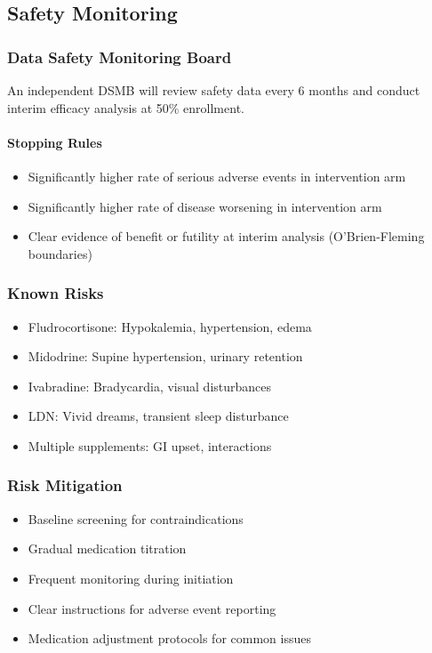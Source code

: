 \subsection{Safety Monitoring}

\subsubsection{Data Safety Monitoring Board}
An independent DSMB will review safety data every 6 months and conduct interim efficacy analysis at 50\% enrollment.

\paragraph{Stopping Rules}
\begin{itemize}
    \item Significantly higher rate of serious adverse events in intervention arm
    \item Significantly higher rate of disease worsening in intervention arm
    \item Clear evidence of benefit or futility at interim analysis (O'Brien-Fleming boundaries)
\end{itemize}

\subsubsection{Known Risks}
\begin{itemize}
    \item Fludrocortisone: Hypokalemia, hypertension, edema
    \item Midodrine: Supine hypertension, urinary retention
    \item Ivabradine: Bradycardia, visual disturbances
    \item LDN: Vivid dreams, transient sleep disturbance
    \item Multiple supplements: GI upset, interactions
\end{itemize}

\subsubsection{Risk Mitigation}
\begin{itemize}
    \item Baseline screening for contraindications
    \item Gradual medication titration
    \item Frequent monitoring during initiation
    \item Clear instructions for adverse event reporting
    \item Medication adjustment protocols for common issues
\end{itemize}

